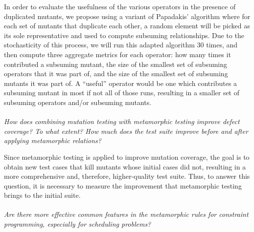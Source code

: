 In order to evaluate the usefulness of the various operators in the presence of duplicated mutants, we propose using a variant of Papadakis' algorithm where for each set of mutants that duplicate each other, a random element will be picked as its sole representative and used to compute subsuming relationships.
Due to the stochasticity of this process, we will run this adapted algorithm 30 times, and then compute three aggregate metrics for each operator: how many times it contributed a subsuming mutant, the size of the smallest set of subsuming operators that it was part of, and the size of the smallest set of subsuming mutants it was part of.
A ``useful'' operator would be one which contributes a subsuming mutant in most if not all of those runs, resulting in a smaller set of subsuming operators and/or subsuming mutants.


\paragraph{\rqmetamorphic} \emph{How does combining mutation testing
  with metamorphic testing improve defect coverage? To what extent?
  How much does the test suite improve before and after applying
  metamorphic relations?}

Since metamorphic testing is applied to improve mutation coverage, the
goal is to obtain new test cases that kill mutants whose initial cases
did not, resulting in a more comprehensive and, therefore,
higher-quality test suite. Thus, to answer this question, it is
necessary to measure the improvement that metamorphic testing brings
to the initial suite.

\paragraph{\rqidentifying}
\emph{Are there more effective common features in the metamorphic
  rules for constraint programming, especially for scheduling
  problems?}

